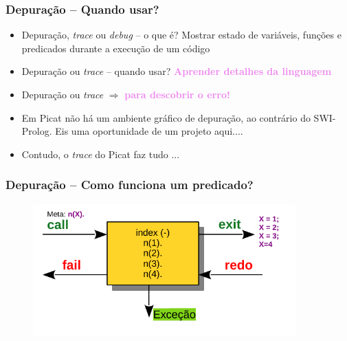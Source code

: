 \begin{frame}[fragile]

    \frametitle{Depuração -- Quando usar?}

    \begin{itemize}
      \item Depuração,  \textit{trace} ou \textit{debug} -- o que é?
      \pause
      Mostrar estado de variáveis, funções e predicados durante a execução de um código
    
      \item Depuração ou \textit{trace} -- quando usar?
      \pause
     \textbf{\textcolor{violet}{Aprender detalhes da linguagem}}

  \pause
  \item Depuração ou \textit{trace} $\Rightarrow $      \textbf{\textcolor{violet}{para descobrir o erro!}}

\pause
    \item Em Picat não há um ambiente gráfico de depuração, 
    ao contrário do SWI-Prolog. 
      \pause
    Eis uma oportunidade de um projeto aqui....
        
    \item Contudo, o \textit{trace} do Picat faz tudo ...
      \pause
    
    \end{itemize}
\end{frame}

\begin{frame}[fragile]

\frametitle{Depuração -- Como funciona um predicado?}

\begin{figure}[!htb]
\begin{center}
\includegraphics[width=0.90\textwidth, height=0.5\textheight]{figures/trace01.pdf}
\end{center}
\end{figure}

\end{frame}


